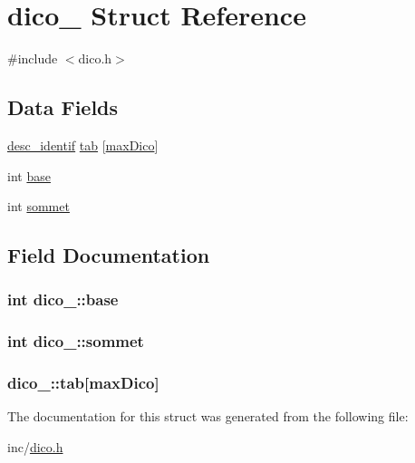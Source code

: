 \hypertarget{structdico__}{}\section{dico\+\_\+ Struct Reference}
\label{structdico__}


{\ttfamily \#include $<$dico.\+h$>$}

\subsection*{Data Fields}
\begin{DoxyCompactItemize}
\item 
\hyperlink{structdesc__identif}{desc\+\_\+identif} \hyperlink{structdico___aaef148453f461e20a057d05a7459695e}{tab} \mbox{[}\hyperlink{dico_8h_a3185f2c5107fb57da926fdfd2ebd1847}{max\+Dico}\mbox{]}
\item 
int \hyperlink{structdico___a75dee872baa0de5b3b2acf15768dc581}{base}
\item 
int \hyperlink{structdico___a314b59b55a3b5e89460afc894fecbff4}{sommet}
\end{DoxyCompactItemize}


\subsection{Field Documentation}
\subsubsection[{\texorpdfstring{base}{base}}]{\setlength{\rightskip}{0pt plus 5cm}int dico\+\_\+\+::base}\hypertarget{structdico___a75dee872baa0de5b3b2acf15768dc581}{}\label{structdico___a75dee872baa0de5b3b2acf15768dc581}
\subsubsection[{\texorpdfstring{sommet}{sommet}}]{\setlength{\rightskip}{0pt plus 5cm}int dico\+\_\+\+::sommet}\hypertarget{structdico___a314b59b55a3b5e89460afc894fecbff4}{}\label{structdico___a314b59b55a3b5e89460afc894fecbff4}
\subsubsection[{\texorpdfstring{tab}{tab}}]{ dico\+\_\+\+::tab\mbox{[}{\bf max\+Dico}\mbox{]}}\hypertarget{structdico___aaef148453f461e20a057d05a7459695e}{}\label{structdico___aaef148453f461e20a057d05a7459695e}


The documentation for this struct was generated from the following file\+:\begin{DoxyCompactItemize}
\item 
inc/\hyperlink{dico_8h}{dico.\+h}\end{DoxyCompactItemize}
